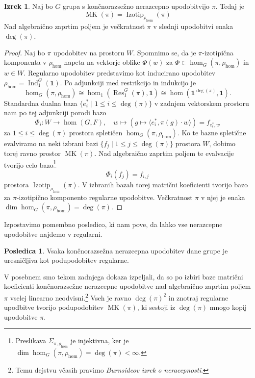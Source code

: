\documentclass[11pt]{book}
\def\11{\mathbf{1}}
\DeclareMathOperator\Res{Res}
\DeclareMathOperator\Ind{Ind}
\DeclareMathOperator\Izotip{Izotip}
\DeclareMathOperator\MK{MK}
\theoremstyle{definition}
\theoremstyle{zgled}
\theoremstyle{odprtproblem}
\theoremstyle{domacanaloga}
\newenvironment{dokaz}
    {\color{siva}\begin{proof}}
    {\end{proof}}
\theoremstyle{izrek}
\newtheorem*{izrek}{Izrek}
\newtheorem*{posledica}{Posledica}
\begin{document}
\begin{izrek}
Naj bo $G$ grupa s končnorazsežno nerazcepno upodobitvijo $\pi$. Tedaj je
\[
   \displaystyle  \MK(\pi) = \Izotip_{\rho_{\hom}}(\pi)
\]
Nad algebraično zaprtim poljem je večkratnost $\pi$ v slednji upodobitvi enaka $\deg(\pi)$.
\end{izrek}
\begin{dokaz}
Naj bo $\pi$ upodobitev na prostoru $W$. Spomnimo se, da je $\pi$-izotipična komponenta v $\rho_{\hom}$ napeta na vektorje oblike $\Phi(w)$ za $\Phi \in \hom_G(\pi, \rho_{\hom})$ in $w \in W$. Regularno upodobitev predstavimo kot inducirano upodobitev $\rho_{\hom} = \Ind^G_1(\11)$. Po adjunkciji med restrikcijo in indukcijo je
\[
    \displaystyle \hom_G(\pi, \rho_{\hom}) \cong \hom_1(\Res^G_1(\pi), \11)
    \cong \hom(\11^{\deg(\pi)}, \11).
\]
Standardna dualna baza $\{ e_i^* \mid 1 \leq i \leq \deg(\pi) \}$ v zadnjem vektorskem prostoru nam po tej adjunkciji porodi bazo
\[
    \Phi_i \colon W \to \hom(G,F), \quad
    w \mapsto \left( g \mapsto \langle e_i^*, \pi(g) \cdot w \rangle \right) = f_{e_i^*, w}
\]
za $1 \leq i \leq \deg(\pi)$ prostora spletičen $\hom_G(\pi, \rho_{\hom})$. Ko te bazne spletične evalviramo na neki izbrani bazi $\{ f_j \mid 1 \leq j \leq \deg(\pi) \}$ prostora $W$, dobimo torej ravno prostor $\MK(\pi)$. Nad algebraično zaprtim poljem te evalvacije tvorijo celo bazo\footnote{Preslikava $\Sigma_{\pi, \rho_{\hom}}$ je injektivna, ker je $\dim \hom_G(\pi, \rho_{\hom}) = \deg(\pi) < \infty$.}
\[
    \Phi_i(f_j) = f_{i,j}
\]
prostora $\Izotip_{\rho_{\hom}}(\pi)$. V izbranih bazah torej matrični koeficienti tvorijo bazo za $\pi$-izotipično komponento regularne upodobitve. Večkratnost $\pi$ v njej je enaka $\dim \hom_G(\pi, \rho_{\hom}) = \deg(\pi)$.
\end{dokaz}

Izpostavimo pomembno posledico, ki nam pove, da lahko vse nerazcepne upodobitve najdemo v regularni.

\begin{posledica}
Vsaka končnorazsežna nerazcepna upodobitev dane grupe je uresničljiva kot podupodobitev regularne.
\end{posledica}

V posebnem smo tekom zadnjega dokaza izpeljali, da so po izbiri baze matrični koeficienti končnorazsežne nerazcepne upodobitve nad algebraično zaprtim poljem $\pi$ vselej linearno neodvisni.\footnote{Temu dejstvu včasih pravimo \emph{Burnsideov izrek o neracepnosti}.} Vseh je ravno $\deg(\pi)^2$ in znotraj regularne upodbitve tvorijo podupodobitev $\MK(\pi)$, ki sestoji iz $\deg(\pi)$ mnogo kopij upodobitve $\pi$.
\end{document}
